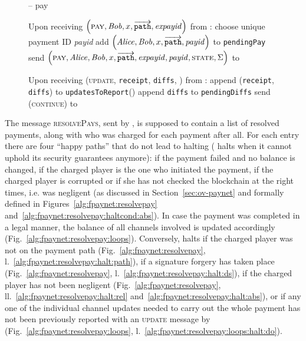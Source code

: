   \begin{figure}[H]
    \begin{systembox}{\fpaynet{} -- pay}
      \begin{algorithmic}[1]
        \State Upon receiving $\left(\textsc{pay}, \mathit{Bob}, x,
        \overrightarrow{\mathtt{path}}, \mathit{expayid}\right)$ from \alice:
        \Indent
          \State choose unique payment ID \textit{payid}
          \State add $\left(\mathit{Alice}, \mathit{Bob}, x, \overrightarrow{\mathtt{path}},
          \mathit{payid}\right)$ to \texttt{pendingPay}
          \State send $\left(\textsc{pay}, \mathit{Alice}, \mathit{Bob}, x,
          \overrightarrow{\mathtt{path}}, \mathit{expayid}, \mathit{payid},
          \textsc{state}, \Sigma\right)$ to \simulator
          \label{alg:fpaynet:pay:send}
        \EndIndent
        \Statex

        \State Upon receiving (\textsc{update}, \texttt{receipt},
        \texttt{diffs}, \alice) from \simulator:
        \label{alg:fpaynet:update}
        \Indent
          \State append (\texttt{receipt}, \texttt{diffs}) to
          \texttt{updatesToReport}(\alice) 
          \label{alg:fpaynet:update:add}
          \State append \texttt{diffs} to \texttt{pendingDiffs}
          \State send (\textsc{continue}) to \simulator
        \EndIndent
      \end{algorithmic}
    \end{systembox}
    \caption{}
    \label{alg:fpaynet:pay}
  \end{figure}

  The message \textsc{resolvePays}, sent by \simulator{}, is supposed to contain
  a list of resolved payments, along with who was charged for each payment after
  all. For each entry there are four ``happy paths'' that do not lead to
  \fpaynet{} halting (\fpaynet{} halts when it cannot uphold its security
  guarantees anymore): if the payment failed and no balance is changed, if the
  charged player is the one who initiated the payment, if the charged player is
  corrupted or if she has not checked the blockchain at the right times, i.e.
  was negligent (as discussed in Section~\ref{sec:ov-paynet} and formally
  defined in Figures~\ref{alg:fpaynet:resolvepay}
  and~\ref{alg:fpaynet:resolvepay:haltcond:abs}). In case the payment was
  completed in a legal manner, the balance of all channels involved is updated
  accordingly (Fig.~\ref{alg:fpaynet:resolvepay:loops}). Conversely, \fpaynet{}
  halts if the charged player was not on the payment path
  (Fig.~\ref{alg:fpaynet:resolvepay},
  l.~\ref{alg:fpaynet:resolvepay:halt:path}), if a signature forgery has taken
  place (Fig.~\ref{alg:fpaynet:resolvepay},
  l.~\ref{alg:fpaynet:resolvepay:halt:ds}), if the charged player has not been
  negligent (Fig.~\ref{alg:fpaynet:resolvepay},
  ll.~\ref{alg:fpaynet:resolvepay:halt:rel}
  and~\ref{alg:fpaynet:resolvepay:halt:abs}), or if any one of the individual
  channel updates needed to carry out the whole payment has not been previously
  reported with an \textsc{update} message by \simulator{}
  (Fig.~\ref{alg:fpaynet:resolvepay:loops},
  l.~\ref{alg:fpaynet:resolvepay:loops:halt:do}).

